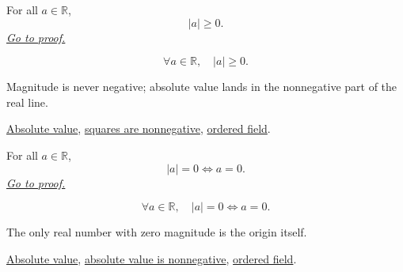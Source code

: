 \begin{theorem}
\label{thm:absolute-value-nonneg}
For all $a \in \mathbb{R}$,
\[
  \lvert a \rvert \ge 0.
\]
\hyperref[prf:absolute-value-nonneg]{\textit{Go to proof.}}
\end{theorem}



\begin{remark*}
\[
  \forall a \in \mathbb{R},\quad \lvert a \rvert \ge 0.
\]
\end{remark*}

\begin{remark*}[Interpretation]
Magnitude is never negative; absolute value lands in the nonnegative part of the real line.
\end{remark*}

\begin{dependencies}
\hyperref[def:absolute-value]{Absolute value},
\hyperref[prop:product-of-positives-is-positive-q]{squares are nonnegative},
\hyperref[def:real-ordered-field]{ordered field}.
\end{dependencies}


\begin{theorem}
\label{thm:absolute-value-zero-iff-zero}
For all $a \in \mathbb{R}$,
\[
  \lvert a \rvert = 0 \iff a = 0.
\]
\hyperref[prf:absolute-value-zero-iff-zero]{\textit{Go to proof.}}
\end{theorem}



\begin{remark*}
\[
  \forall a \in \mathbb{R},\quad
  \lvert a \rvert = 0 \iff a = 0.
\]
\end{remark*}

\begin{remark*}[Interpretation]
The only real number with zero magnitude is the origin itself.
\end{remark*}

\begin{dependencies}
\hyperref[def:absolute-value]{Absolute value},
\hyperref[thm:absolute-value-nonneg]{absolute value is nonnegative},
\hyperref[def:real-ordered-field]{ordered field}.
\end{dependencies}

